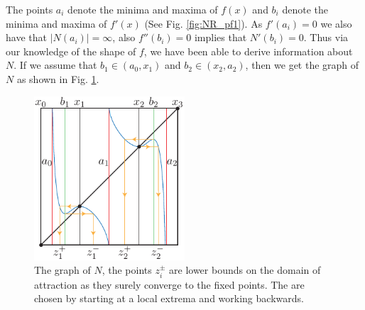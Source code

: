 \begin{ex}
The points $a_i$ denote the minima and maxima of $f(x)$ and $b_i$ denote the minima and maxima of $f'(x)$ (See Fig. \ref{fig:NR_pf1}). As $f'(a_i)=0$ we also have that $|N(a_i)|=\infty $, also $f''(b_i)=0$ implies that $N'(b_i)=0$. Thus via our knowledge of the shape of $f$, we have been able to derive information about $N$. If we assume that $b_1\in (a_0, x_1)$ and $b_2\in (x_2, a_2)$, then we get the graph of $N$ as shown in Fig. \ref{fig:NR_graph1}.
\begin{figure}[h!]
	\centering
	\includegraphics[width=0.5\textwidth]{figures/ch7/3NR_graph1.pdf}
	\caption{The graph of $N$, the points $z_{i}^{\pm}$ are lower bounds on the domain of attraction as they surely converge to the fixed points. The are chosen by starting at a local extrema and working backwards.}
	\label{fig:NR_graph1}
\end{figure}


\end{ex}
